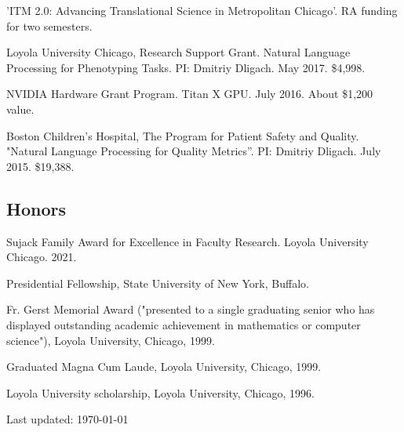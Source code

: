 \documentclass[letterpaper]{article}
\renewenvironment{itemize}{
  \begin{list}{}{
    \setlength{\leftmargin}{1.5em}
  }
}{
  \end{list}
}
\begin{document}
\begin{itemize}
\item 'ITM 2.0: Advancing Translational Science in Metropolitan Chicago'. RA funding for two semesters.
\item Loyola University Chicago, Research Support Grant. Natural Language Processing for Phenotyping Tasks. PI: Dmitriy Dligach. May 2017. \$4,998.
\item NVIDIA Hardware Grant Program. Titan X GPU. July 2016. About \$1,200 value.
\item Boston Children's Hospital, The Program for Patient Safety and Quality. "Natural Language Processing for Quality Metrics''. PI: Dmitriy Dligach. July 2015. \$19,388.
\end{itemize}

\subsection*{Honors}
\begin{itemize}
\item Sujack Family Award for Excellence in Faculty Research. Loyola University Chicago. 2021.
\item Presidential Fellowship, State University of New York, Buffalo.
\item Fr. Gerst Memorial Award ("presented to a single graduating senior who has displayed outstanding academic achievement in mathematics or computer science"), Loyola University, Chicago, 1999.
\item Graduated Magna Cum Laude, Loyola University, Chicago, 1999.
\item Loyola University scholarship, Loyola University, Chicago, 1996.
\end{itemize}

\bigskip

\begin{center}
\begin{footnotesize}
Last updated: \today \\
\end{footnotesize}
\end{center}
\end{document}
